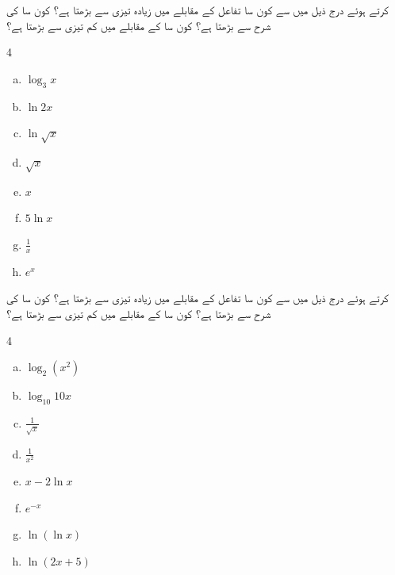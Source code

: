  کرتے ہوئے درج ذیل میں سے کون سا تفاعل  کے مقابلے میں زیادہ تیزی سے بڑھتا ہے؟ کون سا  کی شرح سے بڑھتا ہے؟  کون سا  کے مقابلے میں کم تیزی سے بڑھتا ہے؟
\begin{multicols}{4}
\begin{enumerate}[a.]
\item
$\log_3x$
\item
$\ln 2x$
\item
$\ln \sqrt{x}$
\item
$\sqrt{x}$
\item
$x$
\item
$5\ln x$
\item
$\frac{1}{x}$
\item
$e^x$
\end{enumerate}
\end{multicols}
 کرتے ہوئے درج ذیل میں سے کون سا تفاعل  کے مقابلے میں زیادہ تیزی سے بڑھتا ہے؟ کون سا  کی شرح سے بڑھتا ہے؟  کون سا  کے مقابلے میں کم تیزی سے بڑھتا ہے؟
\begin{multicols}{4}
\begin{enumerate}[a.]
\item
$\log_2(x^2)$
\item
$\log_{10}10x$
\item
$\frac{1}{\sqrt{x}}$
\item
$\frac{1}{x^2}$
\item
$x-2\ln x$
\item
$e^{-x}$
\item
$\ln(\ln x)$
\item
$\ln(2x+5)$
\end{enumerate}
\end{multicols}

